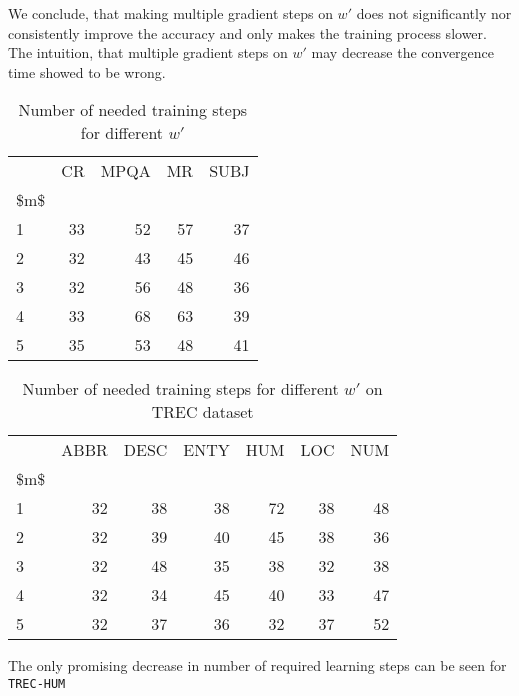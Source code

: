     We conclude, that making multiple gradient steps on $w'$ does not significantly nor consistently improve the accuracy and only makes the training process slower.
    The intuition, that multiple gradient steps on $w'$ may decrease the convergence time showed to be wrong.




\begin{table}[H]
\begin{center}

\begin{tabular}{lrrrr}
\toprule
{} & CR & MPQA & MR & SUBJ \\
\$m\$ &      &       &      &       \\
\midrule
1  &     33 &      52 &     57 &      37 \\
2  &     32 &      43 &     45 &      46 \\
3  &     32 &      56 &     48 &      36 \\
4  &     33 &      68 &     63 &      39 \\
5  &     35 &      53 &     48 &      41 \\
\bottomrule
\end{tabular}

\caption[Number of needed training steps for different $w'$]{Number of needed training steps for different $w'$}
\label{tab:multyw:steps}
\end{center}
\end{table}


\begin{table}[H]
\begin{center}

\begin{tabular}{lrrrrrr}
\toprule
{} & ABBR & DESC & ENTY & HUM & LOC & NUM \\
\$m\$ &          &          &          &         &         &         \\
\midrule
1  &        32 &        38 &        38 &        72 &        38 &        48 \\
2  &        32 &        39 &        40 &        45 &        38 &        36 \\
3  &        32 &        48 &        35 &        38 &        32 &        38 \\
4  &        32 &        34 &        45 &        40 &        33 &        47 \\
5  &        32 &        37 &        36 &        32 &        37 &        52 \\
\bottomrule
\end{tabular}

\caption[Number of needed training steps for different $w'$ on TREC dataset]{Number of needed training steps for different $w'$ on TREC dataset}
\label{tab:multyw:steps:trec}
\end{center}
\end{table}

The only promising decrease in number of required learning steps can be seen for \texttt{TREC-HUM}
    
    \* %
    
    